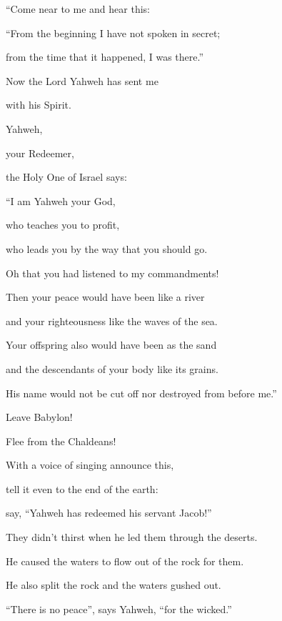 {\par }{\PP {}“Come near to me and hear this:
\par }{\BB \par }{\Q “From the beginning I have not spoken in secret;
\par }{\QB from the time that it happened, I was there.”
\par }{\BB \par }{\Q Now the Lord Yahweh has sent me
\par }{\QB with his Spirit.
\par }{\BB \par }{\Q {}Yahweh,
\par }{\QB your Redeemer,
\par }{\QB the Holy One of Israel says:
\par }{\Q “I am Yahweh your God,
\par }{\QB who teaches you to profit,
\par }{\QB who leads you by the way that you should go.
\par }{\Q {}Oh that you had listened to my commandments!
\par }{\QB Then your peace would have been like a river
\par }{\QB and your righteousness like the waves of the sea.
\par }{\Q {}Your offspring also would have been as the sand
\par }{\QB and the descendants of your body like its grains.
\par }{\QB His name would not be cut off nor destroyed from before me.”
\par }{\BB \par }{\Q {}Leave Babylon!
\par }{\QB Flee from the Chaldeans!
\par }{\Q With a voice of singing announce this,
\par }{\QB tell it even to the end of the earth:
\par }{\QB say, “Yahweh has redeemed his servant Jacob!”
\par }{\Q {}They didn’t thirst when he led them through the deserts.
\par }{\QB He caused the waters to flow out of the rock for them.
\par }{\QB He also split the rock and the waters gushed out.
\par }{\BB \par }{\Q {}“There is no peace”, says Yahweh, “for the wicked.”

}
